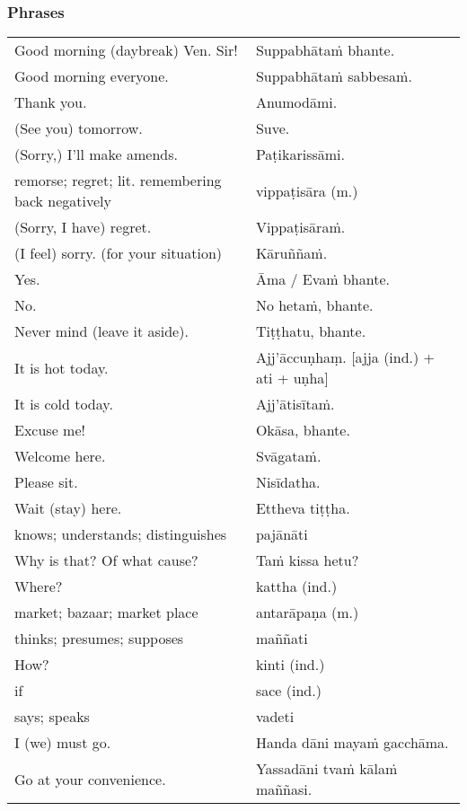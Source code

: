 \documentclass[11pt,oneside]{memoir}
\begin{document}
\normalArrayStrech

\clearpage

\subsubsection{Phrases}
\label{sec:org0a07873}

\begin{center}
\begin{tabular}{ll}
Good morning (daybreak) Ven. Sir! & Suppabhātaṁ bhante.\\[0pt]
Good morning everyone. & Suppabhātaṁ sabbesaṁ.\\[0pt]
Thank you. & Anumodāmi.\\[0pt]
(See you) tomorrow. & Suve.\\[0pt]
(Sorry,) I'll make amends. & Paṭikarissāmi.\\[0pt]
remorse; regret; lit. remembering back negatively & vippaṭisāra (m.)\\[0pt]
(Sorry, I have) regret. & Vippaṭisāraṁ.\\[0pt]
(I feel) sorry. (for your situation) & Kāruññaṁ.\\[0pt]
Yes. & Āma / Evaṁ bhante.\\[0pt]
No. & No hetaṁ, bhante.\\[0pt]
Never mind (leave it aside). & Tiṭṭhatu, bhante.\\[0pt]
It is hot today. & Ajj'āccuṇhaṃ. [ajja (ind.) + ati  + uṇha]\\[0pt]
It is cold today. & Ajj'ātisītaṁ.\\[0pt]
Excuse me! & Okāsa, bhante.\\[0pt]
Welcome here. & Svāgataṁ.\\[0pt]
Please sit. & Nisīdatha.\\[0pt]
Wait (stay) here. & Ettheva tiṭṭha.\\[0pt]
knows; understands; distinguishes & pajānāti\\[0pt]
Why is that? Of what cause? & Taṁ kissa hetu?\\[0pt]
Where? & kattha (ind.)\\[0pt]
market; bazaar; market place & antarāpaṇa (m.)\\[0pt]
thinks; presumes; supposes & maññati\\[0pt]
How? & kinti (ind.)\\[0pt]
if & sace (ind.)\\[0pt]
says; speaks & vadeti\\[0pt]
I (we) must go. & Handa dāni mayaṁ gacchāma.\\[0pt]
Go at your convenience. & Yassadāni tvaṁ kālaṁ maññasi.\\[0pt]
\end{tabular}
\end{center}
\end{document}
